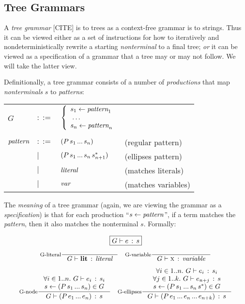 \documentclass[
  11pt,
  paper=letter,
  footinclude=true,
  headinclude=true,
  american
]{scrbook}
\makeatletter
\newenvironment{Table}
  {\begin{center}\begin{tabular}{l l l @{\quad}l}}
  {\end{tabular}\end{center}}
\newcommand{\ddd}{\;\dots\;}
\newcommand{\dd}{\,...\,}
\newcommand{\Forall}[1]{\forall{#1}.\,\,}
\makeatother
\begin{document}
\subsection{Tree Grammars}

A \emph{tree grammar} [CITE] is to trees as a context-free grammar is
to strings. Thus it can be viewed either as a set of instructions for
how to iteratively and nondeterministically rewrite a starting
\emph{nonterminal} to a final tree; \emph{or} it can be viewed as a
specification of a grammar that a tree may or may not follow. We will
take the latter view.

Definitionally, a tree grammar consists of a number of
\emph{productions} that map \emph{nonterminals} $s$ to
\emph{patterns}:
\begin{Table}
  $G$
  &$::=$& $\left\{ \begin{array}{l}
    \production{s_1}{\emph{pattern}_1} \\
    \ddd \\
    \production{s_n}{\emph{pattern}_n}
    \end{array}\right.$ \\
  \\
  $\emph{pattern}$
  &$::=$& $\expr{P}{s_1 \dd s_n}$ &(regular pattern) \\
  &$|$&
  $\exprs{P}{s_1 \dd s_n}{s_{n+1}}$
  &(ellipses pattern) \\
  &$|$&   $\emph{literal}$ &(matches literals) \\
  &$|$&   $\emph{var}$ &(matches variables)
\end{Table}

The \emph{meaning} of a tree grammar (again, we are viewing the
grammar as a \emph{specification}) is that for each production
``$s \leftarrow \emph{pattern}$'', if a term matches the
\emph{pattern}, then it also matches the nonterminal $s$. Formally:

\[
\fbox{$G \vdash e\,:\,s$}
\]

\[
\inference
    [G-literal]
    {}
    {\saysG{G}{\lit{lit}}{\emph{literal}}}
\quad
\inference
    [G-variable]
    {}
    {\saysG{G}{\var{x}}{\emph{variable}}}
\]
    
\[
\inference
    [G-node]
    {\Forall{i \in 1..n} \saysG{G}{e_i}{s_i} \\
      \production{s}{\expr{P}{s_1 \dd s_n}} \in G}
    {\saysG{G}{\expr{P}{e_1 \dd e_n}}{s}}
\quad
\inference
    [G-ellipses]
    {\Forall{i \in 1..n} \saysG{G}{e_i}{s_i} \\
      \Forall{j \in 1..k} \saysG{G}{e_{n+j}}{s} \\
      \production{s}{\exprs{P}{s_1 \dd s_n}{s}} \in G}
    {\saysG{G}{\expr{P}{e_1 \dd e_n \dd e_{n+k}}}{s}}
\]
\end{document}
